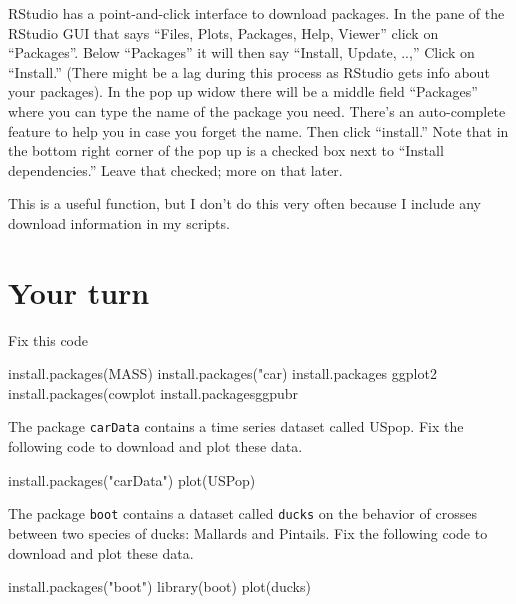 \documentclass[
]{book}
\newenvironment{Shaded}{\begin{snugshade}}{\end{snugshade}}
\newcommand{\FunctionTok}[1]{\textcolor[rgb]{0.00,0.00,0.00}{#1}}
\newcommand{\NormalTok}[1]{#1}
\newcommand{\StringTok}[1]{\textcolor[rgb]{0.31,0.60,0.02}{#1}}
\begin{document}
RStudio has a point-and-click interface to download packages. In the pane of the RStudio GUI that says ``Files, Plots, Packages, Help, Viewer'' click on ``Packages''. Below ``Packages'' it will then say ``Install, Update, ..,'' Click on ``Install.'' (There might be a lag during this process as RStudio gets info about your packages). In the pop up widow there will be a middle field ``Packages'' where you can type the name of the package you need. There's an auto-complete feature to help you in case you forget the name. Then click ``install.'' Note that in the bottom right corner of the pop up is a checked box next to ``Install dependencies.'' Leave that checked; more on that later.

This is a useful function, but I don't do this very often because I include any download information in my scripts.

\hypertarget{your-turn}{%
\section{Your turn}\label{your-turn}}

Fix this code

\begin{Shaded}
\begin{Highlighting}[]
\FunctionTok{install.packages}\NormalTok{(MASS)}
\FunctionTok{install.packages}\NormalTok{(}\StringTok{"car)}
\StringTok{install.packages ggplot2 }
\StringTok{install.packages(cowplot }
\StringTok{install.packagesggpubr }
\end{Highlighting}
\end{Shaded}

The package \texttt{carData} contains a time series dataset called USpop. Fix the following code to download and plot these data.

\begin{Shaded}
\begin{Highlighting}[]
\FunctionTok{install.packages}\NormalTok{(}\StringTok{"carData"}\NormalTok{)}
\FunctionTok{plot}\NormalTok{(USPop)}
\end{Highlighting}
\end{Shaded}

The package \texttt{boot} contains a dataset called \texttt{ducks} on the behavior of crosses between two species of ducks: Mallards and Pintails. Fix the following code to download and plot these data.

\begin{Shaded}
\begin{Highlighting}[]
\FunctionTok{install.packages}\NormalTok{(}\StringTok{"boot"}\NormalTok{)}
\FunctionTok{library}\NormalTok{(boot)}
\FunctionTok{plot}\NormalTok{(ducks)}
\end{Highlighting}
\end{Shaded}
\end{document}
